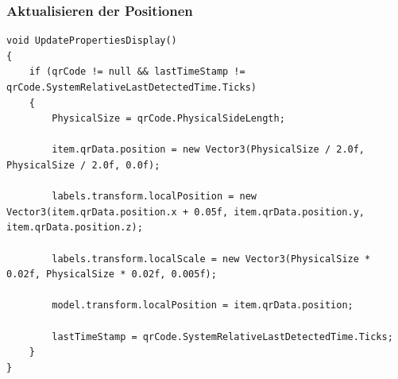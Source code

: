 \subsubsection*{Aktualisieren der Positionen}
\begin{lstlisting}[style=csharp, caption={Aktualisieren der Position}, label=code:Aktualisieren der Position]
void UpdatePropertiesDisplay()
{
    if (qrCode != null && lastTimeStamp != qrCode.SystemRelativeLastDetectedTime.Ticks)
    {
        PhysicalSize = qrCode.PhysicalSideLength;

        item.qrData.position = new Vector3(PhysicalSize / 2.0f, PhysicalSize / 2.0f, 0.0f);

        labels.transform.localPosition = new Vector3(item.qrData.position.x + 0.05f, item.qrData.position.y, item.qrData.position.z);

        labels.transform.localScale = new Vector3(PhysicalSize * 0.02f, PhysicalSize * 0.02f, 0.005f);

        model.transform.localPosition = item.qrData.position;

        lastTimeStamp = qrCode.SystemRelativeLastDetectedTime.Ticks;
    }
}
\end{lstlisting}

